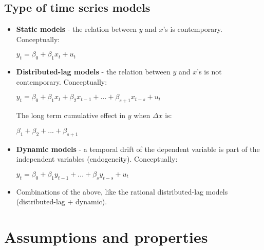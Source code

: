 \documentclass[10pt, a4paper, landscape]{extarticle}
\begin{document}
\begin{multicols}{3}
	\subsection*{Type of time series models}
		\begin{itemize}[leftmargin=*]
			\item \textbf{Static models} - the relation between $y$ and $x$'s is contemporary. Conceptually:
			\begin{center}
				$y_t = \beta_0 + \beta_1 x_t + u_t$
			\end{center}
			\item \textbf{Distributed-lag models} - the relation between $y$ and $x$'s is not contemporary. Conceptually:
			\begin{center}
				$y_t = \beta_0 + \beta_1 x_t + \beta_2 x_{t-1} + ... + \beta_{s+1} x_{t-s} + u_t$
			\end{center}
			The long term cumulative effect in $y$ when $\Delta x$ is:
			\begin{center}
			 	$\beta_1 + \beta_2 + ... + \beta_{s+1}$
			\end{center}
		 	\item \textbf{Dynamic models} - a temporal drift of the dependent variable is part of the independent variables (endogeneity). Conceptually:
		 	\begin{center}
		 		$y_t = \beta_0 + \beta_1 y_{t-1} + ... + \beta_s y_{t-s} + u_t$
		 	\end{center}
	 		\item Combinations of the above, like the rational distributed-lag models (distributed-lag + dynamic).
		\end{itemize}
\columnbreak
\section*{Assumptions and properties}

\end{multicols}
\end{document}
